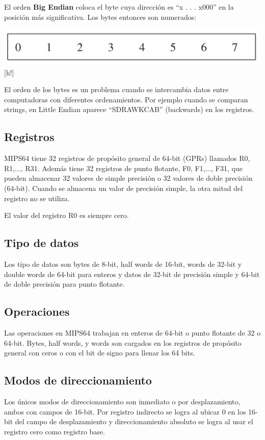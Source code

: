 El orden \textbf{Big Endian} coloca el byte cuya dirección es “x . . . x000”  en la posición más significativa. Los bytes entonces son numerados:

\begin{center}
 \includegraphics[scale=.7,keepaspectratio=true]{gfx/big_endian.png}[h!]
\end{center}

El orden de los bytes es un problema cuando se intercambia datos entre computadoras con diferentes ordenamientos. Por ejemplo cuando se comparan strings, en Little Endian aparece “SDRAWKCAB” (backwards) en los registros.


\subsection{Registros} 
MIPS64 tiene 32 registros de propósito general de 64-bit (GPRs) llamados R0, R1,..., R31. 
Además tiene 32 registros de punto flotante, F0, F1,..., F31, que pueden almacenar 32 valores de simple precisión o 32 valores de doble precisión (64-bit). Cuando se almacena un valor de precisión simple, la otra mitad del registro no se utiliza. 

El valor del registro R0 es siempre cero.


\subsection{Tipo de datos}
Los tipo de datos son bytes de 8-bit, half words de 16-bit, words de 32-bit y double words de 64-bit para enteros y datos de 32-bit de precisión simple y 64-bit de doble precisión para punto flotante.


\subsection{Operaciones}
Las operaciones en MIPS64 trabajan en enteros de 64-bit o punto flotante de 32 o 64-bit. Bytes, half words, y words son cargados en los registros de propósito general con ceros o con el bit de signo para llenar los 64 bits.


\subsection{Modos de direccionamiento}
Los únicos modos de direccionamiento son inmediato o por desplazamiento, ambos con campos de 16-bit. Por registro indirecto se logra al ubicar 0 en los 16-bit del campo de desplazamiento y direccionamiento absoluto se logra al usar el registro cero como registro base.

